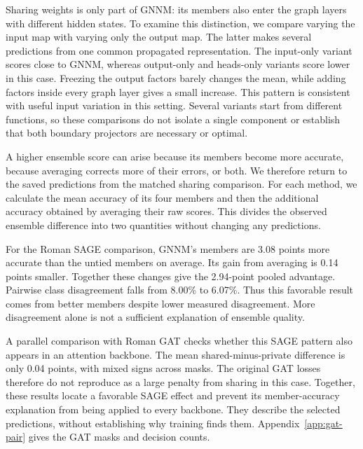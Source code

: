 \documentclass{article}
\begin{document}
Sharing weights is only part of GNNM: its members also enter the graph layers with different hidden states. To examine this distinction, we compare varying the input map with varying only the output map. The latter makes several predictions from one common propagated representation. The input-only variant scores close to GNNM, whereas output-only and heads-only variants score lower in this case. Freezing the output factors barely changes the mean, while adding factors inside every graph layer gives a small increase. This pattern is consistent with useful input variation in this setting. Several variants start from different functions, so these comparisons do not isolate a single component or establish that both boundary projectors are necessary or optimal.

A higher ensemble score can arise because its members become more accurate, because averaging corrects more of their errors, or both. We therefore return to the saved predictions from the matched sharing comparison. For each method, we calculate the mean accuracy of its four members and then the additional accuracy obtained by averaging their raw scores. This divides the observed ensemble difference into two quantities without changing any predictions.

For the Roman SAGE comparison, GNNM's members are 3.08 points more accurate than the untied members on average. Its gain from averaging is 0.14 points smaller. Together these changes give the 2.94-point pooled advantage. Pairwise class disagreement falls from 8.00\% to 6.07\%. Thus this favorable result comes from better members despite lower measured disagreement. More disagreement alone is not a sufficient explanation of ensemble quality.

A parallel comparison with Roman GAT checks whether this SAGE pattern also appears in an attention backbone. The mean shared-minus-private difference is only 0.04 points, with mixed signs across masks. The original GAT losses therefore do not reproduce as a large penalty from sharing in this case. Together, these results locate a favorable SAGE effect and prevent its member-accuracy explanation from being applied to every backbone. They describe the selected predictions, without establishing why training finds them. Appendix~\ref{app:gat-pair} gives the GAT masks and decision counts.
\end{document}
